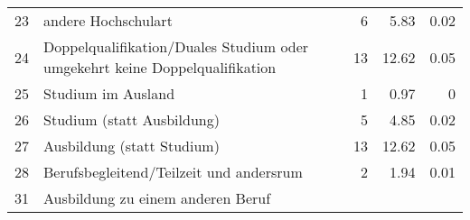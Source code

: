 \begin{longtable}{lXrrr}
     23 &
     \multicolumn{1}{X}{ andere Hochschulart   } &


       \num{6} &
       \num[round-mode=places,round-precision=2]{5,83} &
         \num[round-mode=places,round-precision=2]{0,02} \\

     24 &
     \multicolumn{1}{X}{ Doppelqualifikation/Duales Studium oder umgekehrt keine Doppelqualifikation   } &


       \num{13} &
       \num[round-mode=places,round-precision=2]{12,62} &
         \num[round-mode=places,round-precision=2]{0,05} \\

     25 &
     \multicolumn{1}{X}{ Studium im Ausland   } &


       \num{1} &
       \num[round-mode=places,round-precision=2]{0,97} &
         \num[round-mode=places,round-precision=2]{0} \\

     26 &
     \multicolumn{1}{X}{ Studium (statt Ausbildung)   } &


       \num{5} &
       \num[round-mode=places,round-precision=2]{4,85} &
         \num[round-mode=places,round-precision=2]{0,02} \\

     27 &
     \multicolumn{1}{X}{ Ausbildung (statt Studium)   } &


       \num{13} &
       \num[round-mode=places,round-precision=2]{12,62} &
         \num[round-mode=places,round-precision=2]{0,05} \\

     28 &
     \multicolumn{1}{X}{ Berufsbegleitend/Teilzeit und andersrum   } &


       \num{2} &
       \num[round-mode=places,round-precision=2]{1,94} &
         \num[round-mode=places,round-precision=2]{0,01} \\

     31 &
     \multicolumn{1}{X}{ Ausbildung zu einem anderen Beruf   } &



\end{longtable}
